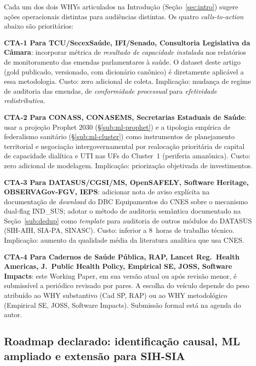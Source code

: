 \documentclass[12pt,a4paper,oneside]{article}
\begin{document}
Cada um dos dois WHYs articulados na Introdução
(Seção~\ref{sec:intro}) sugere ações operacionais distintas
para audiências distintas. Os quatro \textit{calls-to-action}
abaixo são prioritários:

\textbf{CTA-1 \textendash{} Para TCU/SecexSaúde, IFI/Senado,
Consultoria Legislativa da Câmara}: incorporar métrica de
\textit{resultado de capacidade instalada} nos relatórios de
monitoramento das emendas parlamentares à saúde. O dataset deste
artigo (gold publicado, versionado, com dicionário canônico) é
diretamente aplicável a essa metodologia. Custo: zero adicional
de coleta. Implicação: mudança de regime de auditoria das
emendas, de \textit{conformidade processual} para
\textit{efetividade redistributiva}.

\textbf{CTA-2 \textendash{} Para CONASS, CONASEMS, Secretarias
Estaduais de Saúde}: usar a projeção Prophet 2030
(§\ref{sub:ml-prophet}) e a tipologia empírica de federalismo
sanitário (§\ref{sub:ml-cluster}) como instrumentos de
planejamento territorial e negociação intergovernamental por
realocação prioritária de capital de capacidade dialítica e
UTI nas UFs do Cluster~1 (periferia amazônica). Custo: zero
adicional de modelagem. Implicação: priorização objetivada de
investimentos.

\textbf{CTA-3 \textendash{} Para DATASUS/CGSI/MS, OpenSAFELY,
Software Heritage, OBSERVAGov-FGV, IEPS}: adicionar nota de
aviso explícita na documentação de \textit{download} do DBC
Equipamentos do CNES sobre o mecanismo dual-flag IND\_SUS;
adotar o método de auditoria semântica documentado na
Seção~\ref{sub:dedup} como \textit{template} para auditoria de
outros módulos do DATASUS (SIH-AIH, SIA-PA, SINASC). Custo:
inferior a 8~horas de trabalho técnico. Implicação: aumento da
qualidade média da literatura analítica que usa CNES.

\textbf{CTA-4 \textendash{} Para Cadernos de Saúde Pública, RAP,
Lancet Reg.\ Health Americas, J.\ Public Health Policy,
Empirical SE, JOSS, Software Impacts}: este Working Paper, em
sua versão atual ou após revisão menor, é submissível a
periódico revisado por pares. A escolha do veículo depende do
peso atribuído ao WHY substantivo (Cad SP, RAP) ou ao WHY
metodológico (Empirical SE, JOSS, Software Impacts). Submissão
formal está na agenda do autor.

\subsection{Roadmap declarado: identificação causal, ML
ampliado e extensão para SIH-SIA}\label{sub:roadmap}
\end{document}
